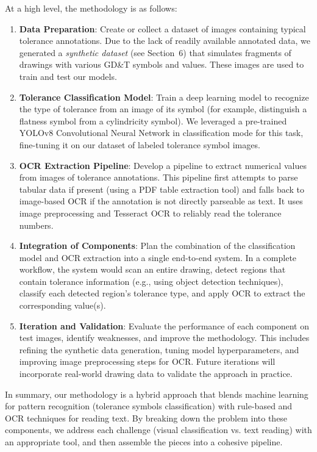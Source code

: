 \documentclass[11pt,a4paper]{article}
\begin{document}
At a high level, the methodology is as follows:
\begin{enumerate}
    \item \textbf{Data Preparation}: Create or collect a dataset of images containing typical tolerance annotations. Due to the lack of readily available annotated data, we generated a \emph{synthetic dataset} (see Section~6) that simulates fragments of drawings with various GD\&T symbols and values. These images are used to train and test our models.
    \item \textbf{Tolerance Classification Model}: Train a deep learning model to recognize the type of tolerance from an image of its symbol (for example, distinguish a flatness symbol from a cylindricity symbol). We leveraged a pre-trained YOLOv8 Convolutional Neural Network in classification mode for this task, fine-tuning it on our dataset of labeled tolerance symbol images.
    \item \textbf{OCR Extraction Pipeline}: Develop a pipeline to extract numerical values from images of tolerance annotations. This pipeline first attempts to parse tabular data if present (using a PDF table extraction tool) and falls back to image-based OCR if the annotation is not directly parseable as text. It uses image preprocessing and Tesseract OCR to reliably read the tolerance numbers.
    \item \textbf{Integration of Components}: Plan the combination of the classification model and OCR extraction into a single end-to-end system. In a complete workflow, the system would scan an entire drawing, detect regions that contain tolerance information (e.g., using object detection techniques), classify each detected region's tolerance type, and apply OCR to extract the corresponding value(s).
    \item \textbf{Iteration and Validation}: Evaluate the performance of each component on test images, identify weaknesses, and improve the methodology. This includes refining the synthetic data generation, tuning model hyperparameters, and improving image preprocessing steps for OCR. Future iterations will incorporate real-world drawing data to validate the approach in practice.
\end{enumerate}

In summary, our methodology is a hybrid approach that blends machine learning for pattern recognition (tolerance symbols classification) with rule-based and OCR techniques for reading text. By breaking down the problem into these components, we address each challenge (visual classification vs. text reading) with an appropriate tool, and then assemble the pieces into a cohesive pipeline.
\end{document}

